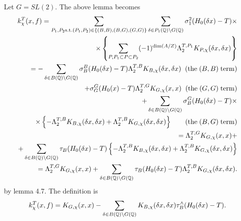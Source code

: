 \begin{example}
Let $G=SL(2)$. The above lemma becomes 
\begin{eqnarray*}
k_\chi ^T(x,f)=
\sum_{ P_1,P_2 {\rm s.t.} (P_1,P_2)\in  \{(B,B),(B,G),(G,G)\}} 
\sum_{\delta \in P_1(\qqq )\backslash G(\qqq )}
\sigma_1^2(H_0(\delta x)-T)\times  \\
\ \times \left\{ \sum_{ P , P_1\subset P\subset P_2 }
(-1)^{\dim (A/Z)}\Lambda _2^{T,P_1}K_{P,\chi }(\delta x,\delta x)\right\}  \\
=-\sum_{\delta \in B(\qqq )\backslash G(\qqq )}\sigma _B^B(H_0(\delta
x)-T)\Lambda _2^{T,B}K_{B,\chi }(\delta x,\delta x)\;\;(\mathrm{the}\;(B,B)\;%
\mathrm{term}) \\
+\sigma _G^G(H_0(x)-T)\Lambda _2^{T,G}K_{G,\chi }(x,x)\;\;(\mathrm{the}%
\;(G,G)\;\mathrm{term}) \\
+\sum_{\delta \in B(\qqq )\backslash G(\qqq )}\sigma _B^G(H_0(\delta
x)-T)\times  \\
\;\;\times \left\{ -\Lambda _2^{T,B}K_{B,\chi }(\delta x,\delta x)+\Lambda
_2^{T,B}K_{G,\chi }(\delta x,\delta x)\right\} \;\;\;\;\;\;\;(\mathrm{the}%
\;(B,G)\;\mathrm{term}) \\
=\Lambda _2^{T,G}K_{G,\chi }(x,x)+ \\
+\sum_{\delta \in B(\qqq )\backslash G(\qqq )}\tau _B(H_0(\delta
x)-T)\left\{ -\Lambda _2^{T,B}K_{B,\chi }(\delta x,\delta x)+\Lambda
_2^{T,B}K_{G,\chi }(\delta x,\delta x)\right\}  \\
=\Lambda _2^{T,G}K_{G,\chi }(x,x)+\sum_{\delta \in B(\qqq )\backslash G(%
\qqq )}\tau _B(H_0(\delta x)-T)\Lambda _2^{T,B}K_{G,\chi }(\delta x,\delta
x).
\end{eqnarray*}
by lemma 4.7. The definition is 
\begin{equation}
k_\chi ^T(x,f)=K_{G,\chi }(x,x)-\sum_{\delta \in B(\qqq )\backslash G(\Bbb{%
Q})}K_{B,\chi }(\delta x,\delta x)\tau _B^{\wedge }(H_0(\delta x)-T).
\end{equation}


\end{example}
